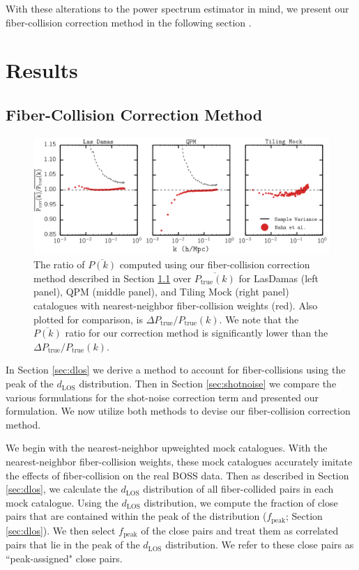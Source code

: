 \documentclass{emulateapj}
\begin{document}
With these alterations to the power spectrum estimator in mind, we present our fiber-collision correction method in the following section . 

\section{Results} 
\subsection{Fiber-Collision Correction Method} \label{sec:apply} 
\begin{figure}
\begin{center}
\includegraphics[scale=0.55]{fcpaper_pk_peakshotnoise_mpfit_comp.png} 
\caption{The ratio of $\overline{P(k)}$ computed using our fiber-collision correction method described in Section \ref{sec:apply} over $\overline{P_\mathrm{true}(k)}$ for LasDamas (left panel), QPM (middle panel), and Tiling Mock (right panel) catalogues with nearest-neighbor fiber-collision weights (red). Also plotted for comparison, is $\Delta P_\mathrm{true}/P_\mathrm{true}(k)$. We note that the $\overline{P(k)}$ ratio for our correction method is significantly lower than the $\Delta P_\mathrm{true}/P_\mathrm{true}(k)$.}\label{fig:peaksn}
\end{center}
\end{figure}

In Section \ref{sec:dlos} we derive a method to account for fiber-collisions using the peak of the $d_\mathrm{LOS}$ distribution. Then in Section \ref{sec:shotnoise} we compare the various formulations for the shot-noise correction term and presented our formulation. We now utilize both methods to devise our fiber-collision correction method. 

We begin with the nearest-neighbor upweighted mock catalogues. With the nearest-neighbor fiber-collision weights, these mock catalogues accurately imitate the effects of fiber-collision on the real BOSS data. Then as described in Section \ref{sec:dlos}, we calculate the $d_\mathrm{LOS}$ distribution of all fiber-collided pairs in each mock catalogue. Using the $d_\mathrm{LOS}$ distribution, we compute the fraction of close pairs that are contained within the peak of the distribution ($f_\mathrm{peak}$; Section \ref{sec:dlos}). We then select $f_\mathrm{peak}$ of the close pairs and treat them as correlated pairs that lie in the peak of the $d_\mathrm{LOS}$ distribution. We refer to these close pairs as ``peak-assigned" close pairs.  
\end{document}
